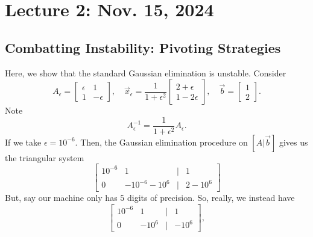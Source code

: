 \pagebreak

\section{Lecture 2: Nov. 15, 2024}

    \subsection{Combatting Instability: Pivoting Strategies}

        Here, we show that the standard Gaussian elimination is unstable. Consider
        \begin{equation*}
            A_\epsilon=\begin{bmatrix}
                \epsilon & 1 \\
                1 & -\epsilon
            \end{bmatrix},\quad\vec{x}_\epsilon=\frac{1}{1+\epsilon^2}\begin{bmatrix}
                2+\epsilon \\ 1-2\epsilon
            \end{bmatrix},\quad
            \vec{b}=\begin{bmatrix}
                1 \\ 2
            \end{bmatrix}.
        \end{equation*}
        Note
        \begin{equation*}
            A_\epsilon^{-1}=\frac{1}{1+\epsilon^2}A_\epsilon.
        \end{equation*}
        If we take \(\epsilon=10^{-6}\). Then, the Gaussian elimination procedure on \([A|\vec{b}]\) gives us the triangular system
        \begin{equation*}
            \begin{bmatrix}
                10^{-6} & 1 & | & 1 \\
                0 & -10^{-6}-10^6 & | & 2-10^6
            \end{bmatrix}
        \end{equation*}
        But, say our machine only has \(5\) digits of precision. So, really, we instead have
        \begin{equation*}
            \begin{bmatrix}
                10^{-6} & 1 & | & 1 \\
                0 & -10^6 & | & -10^6
            \end{bmatrix},
        \end{equation*}
